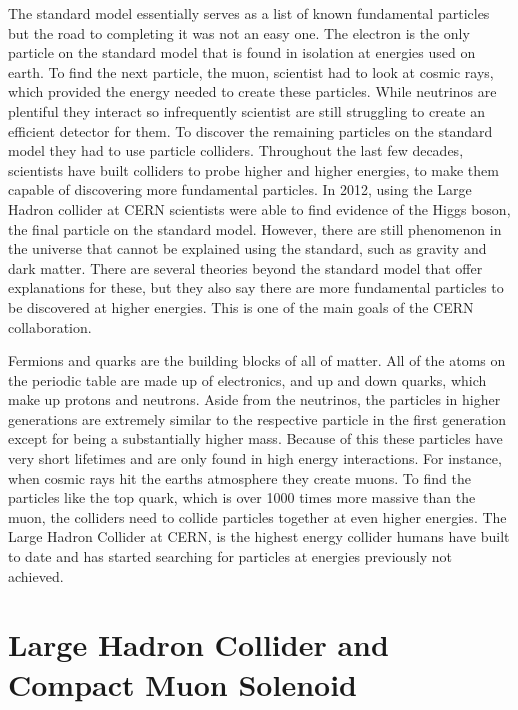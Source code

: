 \documentclass
[]
{thesis}
\begin{document}
The standard model essentially serves as a list of known fundamental particles but the road to completing it was not an easy one. The electron is the only particle on the standard model that is found in isolation at energies used on earth. To find the next particle, the muon, scientist had to look at cosmic rays, which provided the energy needed to create these particles. While neutrinos are plentiful they interact so infrequently scientist are still struggling to create an efficient detector for them. To discover the remaining particles on the standard model they had to use particle colliders. Throughout the last few decades, scientists have built colliders to probe higher and higher energies, to make them capable of discovering more fundamental particles. In 2012, using the Large Hadron collider at CERN scientists were able to find evidence of the Higgs boson, the final particle on the standard model. However, there are still phenomenon in the universe that cannot be explained using the standard, such as gravity and dark matter. There are several theories beyond the standard model that offer explanations for these, but they also say there are more fundamental particles to be discovered at higher energies. This is one of the main goals of the CERN collaboration. 

Fermions and quarks are the building blocks of all of matter. All of the atoms on the periodic table are made up of electronics, and up and down quarks, which make up protons and neutrons. Aside from the neutrinos, the particles in higher generations are extremely similar to the respective particle in the first generation except for being a substantially higher mass. Because of this these particles have very short lifetimes and are only found in high energy interactions. For instance, when cosmic rays hit the earths atmosphere they create muons. To find the particles like the top quark, which is over 1000 times more massive than the muon, the colliders need to collide particles together at even higher energies. The Large Hadron Collider at CERN, is the highest energy collider humans have built to date and has started searching for particles at energies previously not achieved.

\chapter{Large Hadron Collider and Compact Muon Solenoid}
\label{chap:two}
\end{document}
